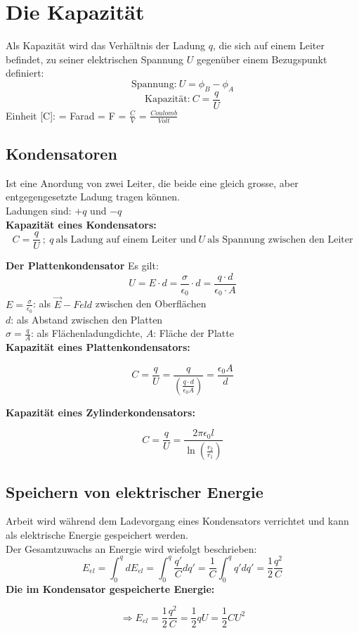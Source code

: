\section{Die Kapazität}

Als Kapazität wird das Verhältnis der Ladung $q$, die sich auf einem Leiter befindet, zu seiner elektrischen Spannung $U$ gegenüber einem Bezugspunkt definiert:
\[
    \text{Spannung:} \ U = \phi_B - \phi_A
\]\[
    \text{Kapazität:} \ C = \frac{q}{U}
\]
Einheit [C]: = Farad = F = $\frac{C}{V}$ = $\frac{Coulomb}{Volt}$

\subsection{Kondensatoren}
Ist eine Anordung von zwei Leiter, die beide eine gleich grosse, aber entgegengesetzte Ladung tragen können.\\[1ex]
Ladungen sind: $+q$ und $-q$ \\[2ex]
\textbf{Kapazität eines Kondensators:} 
\[
    C = \frac{q}{U} \ ; \ q \ \text{als Ladung auf einem Leiter und} \ U \ \text{als Spannung zwischen den Leiter}
\]

\textbf{Der Plattenkondensator}
Es gilt:
\[
    U = E \cdot d = \frac{\sigma}{\epsilon_0} \cdot d = \frac{q \cdot d}{\epsilon_0 \cdot A}
\]
$E = \frac{\sigma}{\epsilon_0}$: als $\Vec{E}-Feld$ zwischen den Oberflächen \\[1ex]
$d$: als Abstand zwischen den Platten \\[1ex]
$\sigma = \frac{q}{A}$: als Flächenladungdichte, $A$: Fläche der Platte \\[2ex]
\textbf{Kapazität eines Plattenkondensators:}
\begin{formulabox}
\[
     C = \frac{q}{U} = \frac{q}{(\frac{q \cdot d}{\epsilon_0 A})} = \frac{\epsilon_0 A}{d}
\]
\end{formulabox}
\textbf{Kapazität eines Zylinderkondensators:}
\begin{formulabox}
    \[
    C = \frac{q}{U} = \frac{2 \pi \epsilon_0 l}{\ln(\frac{r_2}{r_1})}
    \]
\end{formulabox}

\subsection{Speichern von elektrischer Energie}
Arbeit wird während dem Ladevorgang eines Kondensators verrichtet und kann als elektrische Energie gespeichert werden. \\[1ex]
Der Gesamtzuwachs an Energie wird wiefolgt beschrieben: 
\[
    E_{el} = \int_0^q dE_{el} = \int_0^q \frac{q'}{C}dq' = \frac{1}{C}\int_0^q q' dq' = \frac{1}{2}\frac{q^2}{C}
\]
\textbf{Die im Kondensator gespeicherte Energie:}
\begin{formulabox}
    \[
    \Rightarrow E_{el} = \frac{1}{2}\frac{q^2}{C} = \frac{1}{2}qU = \frac{1}{2}CU^2
    \]
\end{formulabox}

